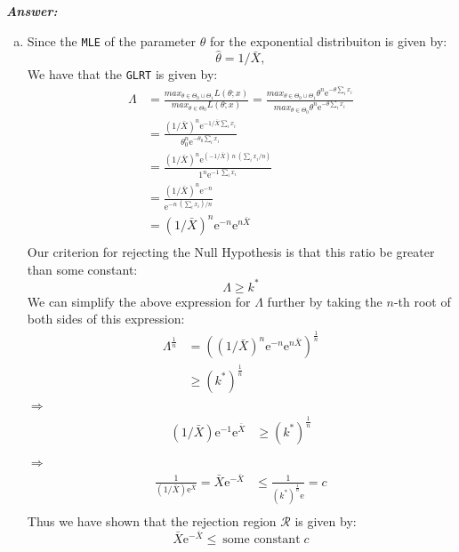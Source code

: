 \documentclass[12pt]{article}
\begin{document}
  \textbf{\color{TealBlue}\emph{Answer:} } 

\begin{enumerate}[(a)]

\item Since the \texttt{MLE} of the parameter $\theta$ for the exponential distribuiton is given by:
$$
\hat \theta = 1 / \bar X,
$$
We have that the \texttt{GLRT} is given by:
\begin{align*}
\Lambda &= \frac{max_{\theta \in \Theta_0 \cup \Theta_1} L(\theta; x) } {max_{\theta \in \Theta_0} L(\theta; x)  }
= \frac{max_{\theta \in \Theta_0 \cup \Theta_1} \theta^n \mathrm{e}^{-\theta \sum_i x_i} } {max_{\theta \in \Theta_0} \theta^n \mathrm{e}^{-\theta \sum_i x_i} }\\
&= \frac{(1 / \bar X)^n \mathrm{e}^{- 1/ \bar X \sum_i x_i }} {\theta_0^n \mathrm{e}^{-\theta_0 \sum_i x_i}} \\
&= \frac{(1 / \bar X)^n \mathrm{e}^{(- 1/ \bar X) \ n \ (\sum_i x_i / n) }}{1^n \mathrm{e}^{-1 \ \sum_i x_i}} \\
&=  \frac{(1 / \bar X)^n \mathrm{e}^{-n} } {\mathrm{e}^{-n \ (\sum_i x_i) / n}} \\
&= (1 / \bar X)^n \mathrm{e}^{ -n } \mathrm{e}^{n \bar X} \\
\end{align*}
Our criterion for rejecting the Null Hypothesis is that this ratio be greater than some constant:
$$
\Lambda \geq k^*
$$
We can simplify the above expression for $\Lambda$ further by taking the $n$-th root of both sides of this expression:
\begin{align*}
\Lambda^{\frac{1}{n}}  &=  \left( (1 / \bar X)^n \mathrm{e}^{ -n } \mathrm{e}^{n \bar X} \right)^{\frac{1}{n}}\\
&\geq  (k^*)^{\frac{1}{n}}
\end{align*}
$\Rightarrow$
\begin{align*}
 (1 / \bar X) \mathrm{e}^{ -1 } \mathrm{e}^{\bar X} & \geq (k^*)^{\frac{1}{n}} \\
\end{align*}
$\Rightarrow$
\begin{align*}
 \frac{1} {(1 / \bar X) \mathrm{e}^{\bar X}} =\bar X \mathrm{e}^{-\bar X}  & \leq \frac{1} {(k^*)^{\frac{1}{n}} \mathrm{e}} = c \\
\end{align*}
Thus we have shown that the rejection region $\mathcal{R}$ is given by:
$$
\boxed{\bar X \mathrm{e}^{-\bar X} \leq \ \text{some constant} \; c }
$$
\bigskip


\end{enumerate}
\end{document}
